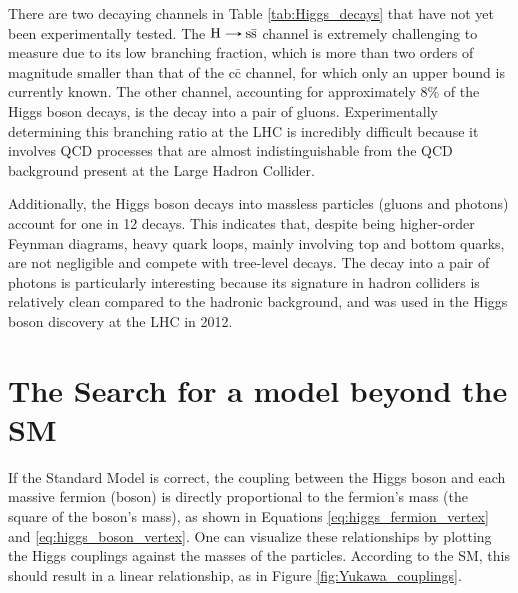 There are two decaying channels in Table \ref{tab:Higgs_decays} that have not yet been experimentally tested. The $\text{H}\decaysto \text{s}\bar{\text{s}}$ channel is extremely challenging to measure due to its low branching fraction, which is more than two orders of magnitude smaller than that of the $\text{c}\bar{\text{c}}$ channel, for which only an upper bound is currently known. The other channel, accounting for approximately 8\% of the Higgs boson decays, is the decay into a pair of gluons. Experimentally determining this branching ratio at the LHC is incredibly difficult because it involves QCD processes that are almost indistinguishable from the QCD background present at the Large Hadron Collider.

Additionally, the Higgs boson decays into massless particles (gluons and photons) account for one in 12 decays. This indicates that, despite being higher-order Feynman diagrams, heavy quark loops, mainly involving top and bottom quarks, are not negligible and compete with tree-level decays. The decay into a pair of photons is particularly interesting because its signature in hadron colliders is relatively clean compared to the hadronic background, and was used in the Higgs boson discovery at the LHC in 2012.

\section{The Search for a model beyond the SM}\label{sec:BSM}

If the Standard Model is correct, the coupling between the Higgs boson and each massive fermion (boson) is directly proportional to the fermion's mass (the square of the boson's mass), as shown in Equations \eqref{eq:higgs_fermion_vertex} and \eqref{eq:higgs_boson_vertex}. One can visualize these relationships by plotting the Higgs couplings against the masses of the particles. According to the SM, this should result in a linear relationship, as in Figure \ref{fig:Yukawa_couplings}.


